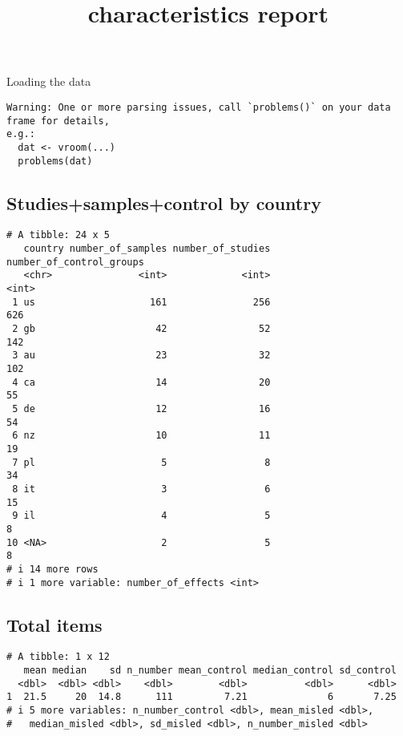 \documentclass[
  letterpaper,
  DIV=11,
  numbers=noendperiod]{scrartcl}
\title{characteristics report}
\author{}
\date{}
\begin{document}
\maketitle
\ifdefined\Shaded\renewenvironment{Shaded}{\begin{tcolorbox}[sharp corners, frame hidden, borderline west={3pt}{0pt}{shadecolor}, enhanced, boxrule=0pt, breakable, interior hidden]}{\end{tcolorbox}}\fi

Loading the data

\begin{verbatim}
Warning: One or more parsing issues, call `problems()` on your data frame for details,
e.g.:
  dat <- vroom(...)
  problems(dat)
\end{verbatim}

\hypertarget{studiessamplescontrol-by-country}{%
\subsection{Studies+samples+control by
country}\label{studiessamplescontrol-by-country}}

\begin{verbatim}
# A tibble: 24 x 5
   country number_of_samples number_of_studies number_of_control_groups
   <chr>               <int>             <int>                    <int>
 1 us                    161               256                      626
 2 gb                     42                52                      142
 3 au                     23                32                      102
 4 ca                     14                20                       55
 5 de                     12                16                       54
 6 nz                     10                11                       19
 7 pl                      5                 8                       34
 8 it                      3                 6                       15
 9 il                      4                 5                        8
10 <NA>                    2                 5                        8
# i 14 more rows
# i 1 more variable: number_of_effects <int>
\end{verbatim}

\hypertarget{total-items}{%
\subsection{Total items}\label{total-items}}

\begin{verbatim}
# A tibble: 1 x 12
   mean median    sd n_number mean_control median_control sd_control
  <dbl>  <dbl> <dbl>    <dbl>        <dbl>          <dbl>      <dbl>
1  21.5     20  14.8      111         7.21              6       7.25
# i 5 more variables: n_number_control <dbl>, mean_misled <dbl>,
#   median_misled <dbl>, sd_misled <dbl>, n_number_misled <dbl>
\end{verbatim}
\end{document}
